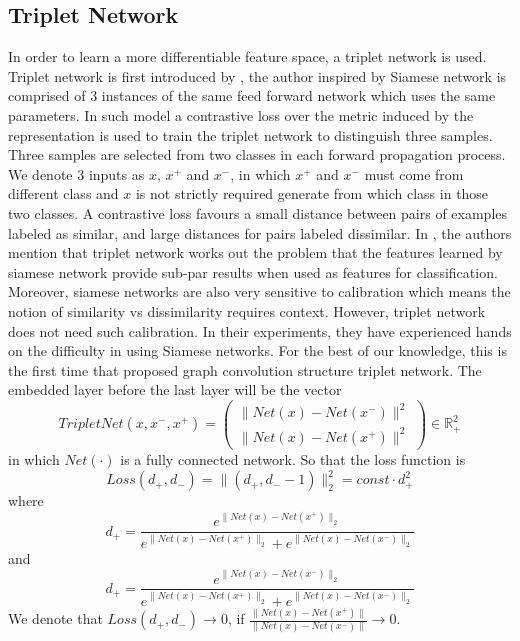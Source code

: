 \documentclass[11pt]{article}
\begin{document}
\subsection{Triplet Network}
In order to learn a more differentiable feature space, a triplet network is used. Triplet network is first introduced by \cite{Hoffer2015Deep}, the author inspired by Siamese network is comprised of 3 instances of the same feed forward network which uses the same parameters. In such model a contrastive loss over the metric induced by the representation is used to train the triplet network to distinguish three samples. Three samples are selected from two classes in each forward propagation process. We denote 3 inputs as $x$, $x^+$ and $x^-$, in which $x^+$ and $x^-$ must come from different class and $x$ is not strictly required generate from which class in those two classes. A contrastive loss favours a small distance between pairs of examples labeled as similar, and large distances for pairs labeled dissimilar. In \cite{Hoffer2015Deep}, the authors mention that triplet network works out the problem that the features learned by siamese network provide sub-par results when used as features for classification. Moreover, siamese networks are also very sensitive to calibration which means the notion of similarity vs dissimilarity requires context. However, triplet network does not need such calibration. In their experiments, they have experienced hands on the difficulty in using Siamese networks. For the best of our knowledge, this is the first time that proposed graph convolution structure triplet network. The embedded layer before the last layer will be the vector
\begin{equation}
	TripletNet(x,x^-,x^+)= \begin{pmatrix} \|Net(x)-Net(x^-)\|^2\\ 
	 \|Net(x)-Net(x^+)\|^2\end{pmatrix}\in\mathbb{R}^2_+
\end{equation}
in which $Net(\cdot)$ is a fully connected network. So that the loss function is 
\begin{equation}
	Loss(d_+,d_-)=\|(d_+,d_--1)\|_2^2=const\cdot d_+^2
\end{equation}
where
\begin{equation}
	d_+=\frac{e^{\|Net(x)-Net(x^+)\|_2}}{e^{\|Net(x)-Net(x^+)\|_2}+e^{\|Net(x)-Net(x^-)\|_2}}
\end{equation}
and
\begin{equation}
	d_+=\frac{e^{\|Net(x)-Net(x^-)\|_2}}{e^{\|Net(x)-Net(x^+)\|_2}+e^{\|Net(x)-Net(x^-)\|_2}}
\end{equation}
We denote that $Loss(d_+,d_-)\rightarrow0$, if $\frac{\|Net(x)-Net(x^+)\|}{\|Net(x)-Net(x^-)\|}\rightarrow0$.
\end{document}
